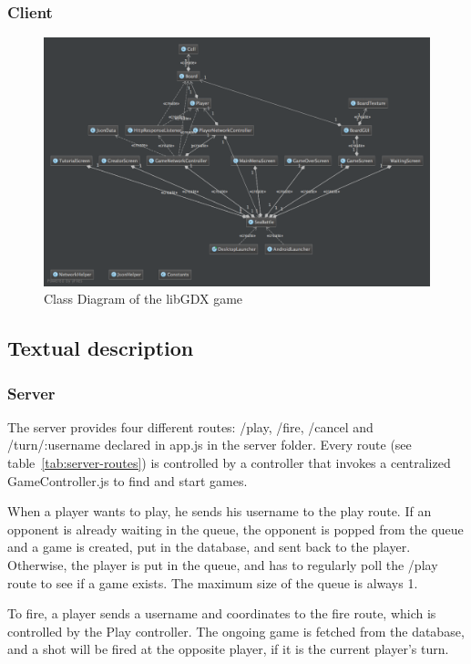 \subsubsection{Client}

\begin{figure}[H]
    \hspace*{-0.7in}
    \includegraphics[scale=0.5]{figs/client_class_diagram.png}
    \caption{Class Diagram of the libGDX game}
    \label{fig:class_diagram_client}
\end{figure}



\subsection{Textual description}

\subsubsection{Server}
The server provides four different routes: /play, /fire, /cancel and /turn/:username declared in app.js in the server folder. Every route (see table~\ref{tab:server-routes}) is controlled by a controller that invokes a centralized GameController.js to find and start games.  

When a player wants to play, he sends his username to the play route. If an opponent is already waiting in the queue, the opponent is popped from the queue and a game is created, put in the database, and sent back to the player. Otherwise, the player is put in the queue, and has to regularly poll the /play route to see if a game exists. The maximum size of the queue is always 1. 

To fire, a player sends a username and coordinates to the fire route, which is controlled by the Play controller. The ongoing game is fetched from the database, and a shot will be fired at the opposite player, if it is the current player's turn.

